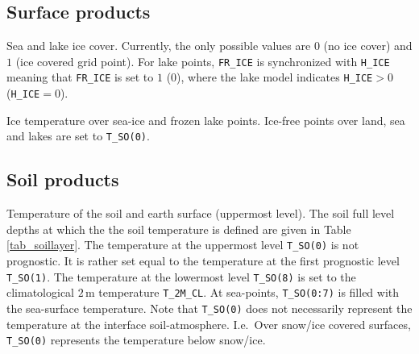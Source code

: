\subsection{Surface products}
\begin{description}[leftmargin=3.0cm,style=sameline]
 \item [FR\_ICE] Sea and lake ice cover. Currently, the only possible values are $0$ (no ice cover) and $1$ (ice covered grid point). For 
                 lake points, \texttt{FR\_ICE} is synchronized with \texttt{H\_ICE} meaning that \texttt{FR\_ICE} is set to $1$ ($0$), 
                 where the lake model indicates \texttt{H\_ICE}$>0$ (\texttt{H\_ICE}$=0$).
 \item [T\_ICE] Ice temperature over sea-ice and frozen lake points. Ice-free points over land, sea and lakes are set to \texttt{T\_SO(0)}.
\end{description}


\subsection{Soil products}
\begin{description}[leftmargin=3.0cm,style=sameline]
 \item [T\_SO] Temperature of the soil and earth surface (uppermost level). The soil full level depths at which the 
the soil temperature is defined are given in Table \ref{tab_soillayer}. The temperature at the uppermost level \texttt{T\_SO(0)} 
is not prognostic. It is rather set equal to the temperature at the first prognostic level \texttt{T\_SO(1)}. The temperature 
at the lowermost level \texttt{T\_SO(8)} is set to the climatological $2\,\mathrm{m}$ temperature \texttt{T\_2M\_CL}. At 
sea-points, \texttt{T\_SO(0:7)} is filled with the sea-surface temperature. Note that \texttt{T\_SO(0)} does not necessarily 
represent the temperature at the interface soil-atmosphere. I.e.\ Over snow/ice covered surfaces, \texttt{T\_SO(0)} 
represents the temperature below snow/ice.
\end{description}
